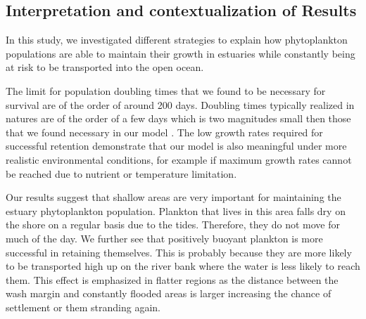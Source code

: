 \documentclass[npg, manuscript]{copernicus}
\begin{document}


\subsection{Interpretation and contextualization of Results}

In this study, we investigated different strategies to explain how phytoplankton populations are able to maintain their growth in estuaries while constantly being at risk to be transported into the open ocean.

The limit for population doubling times that we found to be necessary for survival are of the order of around 200 days. Doubling times typically realized in natures are of the order of a few days which is two magnitudes small then those that we found necessary in our model \citep{Koch2004,Wirtz2011}.
The low growth rates required for successful retention demonstrate that our model is also meaningful under more realistic environmental conditions, for example if maximum growth rates cannot be reached due to nutrient or temperature limitation.

Our results suggest that shallow areas are very important for maintaining the estuary phytoplankton population.
Plankton that lives in this area falls dry on the shore on a regular basis due to the tides. 
Therefore, they do not move for much of the day.
We further see that positively buoyant plankton is more successful in retaining themselves. 
This is probably because they are more likely to be transported high up on the river bank where the water is less likely to reach them.
This effect is emphasized in flatter regions as the distance between the wash margin and constantly flooded areas is larger increasing the chance of settlement or them stranding again.
\end{document}
